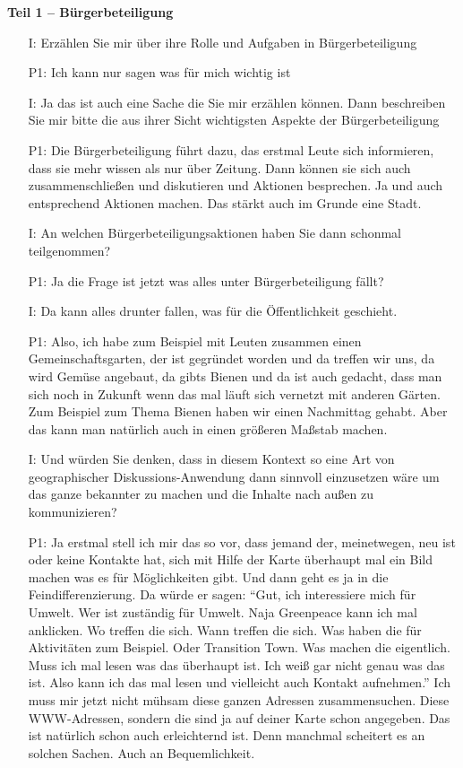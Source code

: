\textbf{Teil 1 -- B{\"u}rgerbeteiligung}
\begin{itemize}
    \item[I:] Erz{\"a}hlen Sie mir {\"u}ber ihre Rolle und Aufgaben in B{\"u}rgerbeteiligung
    \item[P1:] Ich kann nur sagen was f{\"u}r mich wichtig ist
    \item[I:] Ja das ist auch eine Sache die Sie mir erz{\"a}hlen k{\"o}nnen. Dann beschreiben Sie mir bitte die aus ihrer Sicht wichtigsten Aspekte der B{\"u}rgerbeteiligung
    \item[P1:] Die B{\"u}rgerbeteiligung f{\"u}hrt dazu, das erstmal Leute sich informieren, dass sie mehr wissen als nur {\"u}ber Zeitung. Dann k{\"o}nnen sie sich auch zusammenschlie{\ss}en und diskutieren und Aktionen besprechen. Ja und auch entsprechend Aktionen machen. Das st{\"a}rkt auch im Grunde eine Stadt.
    \item[I:] An welchen B{\"u}rgerbeteiligungsaktionen haben Sie dann schonmal teilgenommen?
	\item[P1:] Ja die Frage ist jetzt was alles unter B{\"u}rgerbeteiligung f{\"a}llt?
	\item[I:] Da kann alles drunter fallen, was f{\"u}r die {\"O}ffentlichkeit geschieht.
	\item[P1:] Also, ich habe zum Beispiel mit Leuten zusammen einen Gemeinschaftsgarten, der ist gegr{\"u}ndet worden und da treffen wir uns, da wird Gem{\"u}se angebaut, da gibts Bienen und da ist auch gedacht, dass man sich noch in Zukunft wenn das mal l{\"a}uft sich vernetzt mit anderen G{\"a}rten. Zum Beispiel zum Thema Bienen haben wir einen Nachmittag gehabt. Aber das kann man nat{\"u}rlich auch in einen gr{\"o}{\ss}eren Ma{\ss}stab machen.
	\item[I:] Und w{\"u}rden Sie denken, dass in diesem Kontext so eine Art von geographischer Diskussions-Anwendung dann sinnvoll einzusetzen w{\"a}re um das ganze bekannter zu machen und die Inhalte nach au{\ss}en zu kommunizieren?
	\item[P1:] Ja erstmal stell ich mir das so vor, dass jemand der, meinetwegen, neu ist oder keine Kontakte hat, sich mit Hilfe der Karte {\"u}berhaupt mal ein Bild machen was es f{\"u}r M{\"o}glichkeiten gibt. Und dann geht es ja in die Feindifferenzierung. Da w{\"u}rde er sagen: "`Gut, ich interessiere mich f{\"u}r Umwelt. Wer ist zust{\"a}ndig f{\"u}r Umwelt. Naja Greenpeace kann ich mal anklicken. Wo treffen die sich. Wann treffen die sich. Was haben die f{\"u}r Aktivit{\"a}ten zum Beispiel. Oder Transition Town. Was machen die eigentlich. Muss ich mal lesen was das {\"u}berhaupt ist. Ich wei{\ss} gar nicht genau was das ist. Also kann ich das mal lesen und vielleicht auch Kontakt aufnehmen."' Ich muss mir jetzt nicht m{\"u}hsam diese ganzen Adressen zusammensuchen. Diese WWW-Adressen, sondern die sind ja auf deiner Karte schon angegeben. Das ist nat{\"u}rlich schon auch erleichternd ist. Denn manchmal scheitert es an solchen Sachen. Auch an Bequemlichkeit.

\end{itemize}
